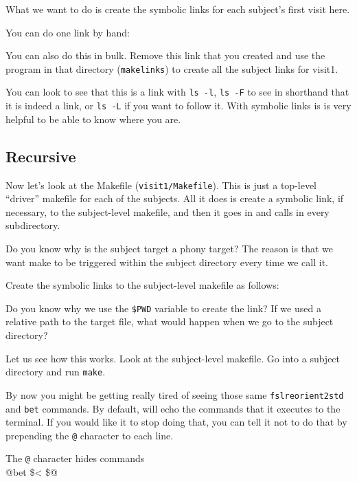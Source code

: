 What we want to do is create the symbolic links for each subject's first visit here. 

You can do one link by hand:

You can also do this in bulk. Remove this link that you created and
use the program in that directory (\texttt{makelinks}) to create all the subject links for visit1. 

You can look to see that this is a link with \texttt{ls -l}, \texttt{ls -F} to see
in shorthand that it is indeed a link, or \texttt{ls -L} if you want to follow
it. With symbolic links is is very helpful to be able to know where
you are.

\subsection{Recursive \maken{}}
Now let's look at the Makefile 
(\texttt{visit1/Makefile}).  This is just a 
top-level ``driver'' makefile for each of the subjects. All it does is
create a symbolic link, if necessary, to the subject-level makefile,
and then it goes in and calls \maken{} in every subdirectory.

Do you know why is the subject target a phony target? The reason is
that we want make to be triggered within the subject directory every
time we call it.

Create the symbolic links to the subject-level makefile as follows:

Do you know why we use the \texttt{\$PWD} variable to create the link?
If we used a relative path to the target file, what would happen when
we go to the subject directory?

Let us see how this works. Look at the subject-level makefile. Go into
a subject directory and run \texttt{make}.

By now you might be getting really tired of seeing those same
\texttt{fslreorient2std} and \texttt{bet} commands. By default, \maken{}
will echo the commands that it executes to the terminal. If you would
like it to stop doing that, you can tell it not to do that by
prepending the \texttt{@} character to each line.
\begin{make}{The \texttt{@} character hides commands}{}
\\
  \tab @bet \$< \$@
\end{make}

